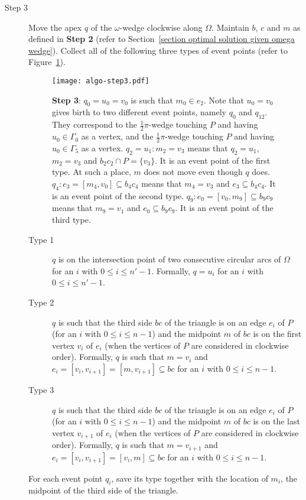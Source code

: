 \documentclass[11pt, oneside]{article}
\begin{document}
\begin{description}
\item[Step 3] Move the apex $q$ of the $\omega$-wedge
clockwise along $\Omega$.
Maintain $b$, $c$ and $m$
as defined in {\bf Step 2}
(refer to Section~\ref{section optimal solution given omega wedge}).
Collect all of the following three types of event points
(refer to Figure~\ref{figure algo-step3}).
\begin{figure}
\centering
\texttt{[image: algo-step3.pdf]}
\caption{{\bf Step 3}:
$q_0=u_0=v_0$ is such that $m_0\in e_2$.
Note that $u_0=v_0$ gives birth to two different event points,
namely $q_0$ and $q_{12}$.
They correspond to the $\frac{1}{2}\pi$-wedge touching $P$
and having $u_0\in\Gamma_0$ as a vertex,
and the $\frac{1}{2}\pi$-wedge touching $P$
and having $u_0\in\Gamma_5$ as a vertex.
$q_2 = u_1:m_2=v_3$ means that $q_2=u_1$,
$m_2=v_3$
and $b_2c_2 \cap P = \{v_3\}$.
It is an event point of the first type.
At such a place, 
$m$ does not move even though $q$ does.
$q_4:e_3=[m_4,v_0]\subseteq b_4c_4$ means that
$m_4=v_3$ and $e_3\subseteq b_4c_4$.
It is an event point of the second type.
$q_9:e_0=[v_0,m_9]\subseteq b_9c_9$ means that
$m_9=v_1$ and $e_0\subseteq b_9c_9$.
It is an event point of the third type.\label{figure algo-step3}}
\end{figure}
\begin{description}
\item[Type 1]
$q$ is on the intersection point of two consecutive circular arcs of $\Omega$ 
for an $i$ with $0\leq i \leq n'-1$.
Formally,
$q=u_i$ for an $i$ with $0\leq i \leq n'-1$.

\item[Type 2]
$q$ is such that the third side $bc$ of the triangle
is on an edge $e_i$ of $P$
(for an $i$ with $0\leq i \leq n-1$)
and the midpoint $m$ of $bc$
is on the first vertex $v_i$ of $e_i$
(when the vertices of $P$ are considered in clockwise order).
Formally,
$q$ is such that $m=v_i$ and $e_i=[v_i,v_{i+1}]=[m,v_{i+1}] \subseteq bc$ 
for an $i$ with $0\leq i \leq n-1$.

\item[Type 3]
$q$ is such that the third side $bc$ of the triangle
is on an edge $e_i$ of $P$
(for an $i$ with $0\leq i \leq n-1$)
and the midpoint $m$ of $bc$
is on the last vertex $v_{i+1}$ of $e_i$
(when the vertices of $P$ are considered in clockwise order).
Formally,
$q$ is such that $m=v_{i+1}$ and $e_i=[v_i,v_{i+1}]=[v_i,m] \subseteq bc$ 
for an $i$ with $0\leq i \leq n-1$.
\end{description}

For each event point $q_i$,
save its type together with the location of $m_i$,
the midpoint of the third side of the triangle.
\end{description}
\end{document}
